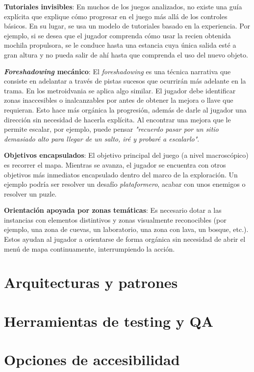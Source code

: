 \textbf{Tutoriales invisibles}: En muchos de los juegos analizados, no existe una guía explícita que explique cómo progresar en el juego más allá de los controles básicos. En su lugar, se usa un modelo de tutoriales basado en la experiencia. Por ejemplo, si se desea que el jugador comprenda cómo usar la recien obtenida mochila propulsora, se le conduce hasta una estancia cuya única salida esté a gran altura y no pueda salir de ahí hasta que comprenda el uso del nuevo objeto.


\textbf{\textit{Foreshadowing} mecánico}: El \textit{foreshadowing} es una técnica narrativa que consiste en adelantar a través de pistas sucesos que ocurrirán más adelante en la trama. En los metroidvania se aplica algo similar. El jugador debe identificar zonas inaccesibles o inalcanzables por antes de obtener la mejora o llave que requieran. Esto hace más orgánica la progresión, además de darle al jugador una dirección sin necesidad de hacerla explícita. Al encontrar una mejora que le permite escalar, por ejemplo, puede pensar \textit{"recuerdo pasar por un sitio demasiado alto para llegar de un salto, iré y probaré a escalarlo"}.


\textbf{Objetivos encapsulados}: El objetivo principal del juego (a nivel macroscópico) es recorrer el mapa. Mientras se avanza, el jugador se encuentra con otros objetivos más inmediatos encapsulado dentro del marco de la exploración. Un ejemplo podría ser resolver un desafío \textit{plataformero}, acabar con unos enemigos o resolver un puzle. 


\textbf{Orientación apoyada por zonas temáticas}: Es necesario dotar a las instancias con elementos distintivos y zonas visualmente reconocibles (por ejemplo, una zona de cuevas, un laboratorio, una zona con lava, un bosque, etc.). Estos ayudan al jugador a orientarse de forma orgánica sin necesidad de abrir el menú de mapa continuamente, interrumpiendo la acción.

\section{Arquitecturas y patrones}

\section{Herramientas de testing y QA}

\section{Opciones de accesibilidad}
